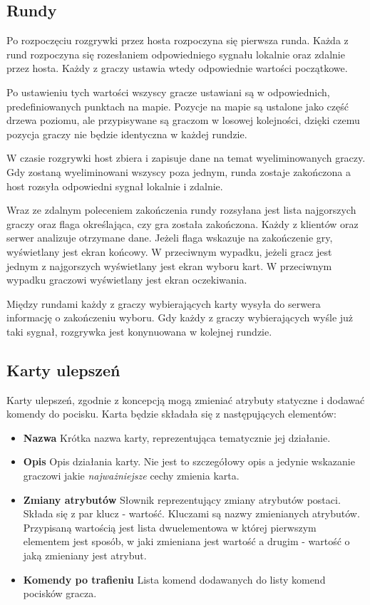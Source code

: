 \subsection{Rundy}
Po rozpoczęciu rozgrywki przez hosta rozpoczyna się pierwsza runda. Każda z rund rozpoczyna się rozesłaniem odpowiedniego sygnału lokalnie oraz zdalnie przez hosta. Każdy z graczy ustawia wtedy odpowiednie wartości początkowe. 

Po ustawieniu tych wartości wszyscy gracze ustawiani są w odpowiednich, predefiniowanych punktach na mapie. Pozycje na mapie są ustalone jako część drzewa poziomu, ale przypisywane są graczom w losowej kolejności, dzięki czemu pozycja graczy nie będzie identyczna w każdej rundzie.

W czasie rozgrywki host zbiera i zapisuje dane na temat wyeliminowanych graczy. Gdy zostaną wyeliminowani wszyscy poza jednym, runda zostaje zakończona a host rozsyła odpowiedni sygnał lokalnie i zdalnie. 

Wraz ze zdalnym poleceniem zakończenia rundy rozsyłana jest lista najgorszych graczy oraz flaga określająca, czy gra została zakończona. Każdy z klientów oraz serwer analizuje otrzymane dane. Jeżeli flaga wskazuje na zakończenie gry, wyświetlany jest ekran końcowy. W przeciwnym wypadku, jeżeli gracz jest jednym z najgorszych wyświetlany jest ekran wyboru kart. W przeciwnym wypadku graczowi wyświetlany jest ekran oczekiwania.

Między rundami każdy z graczy wybierających karty wysyła do serwera informację o zakończeniu wyboru. Gdy każdy z graczy wybierających wyśle już taki sygnał, rozgrywka jest konynuowana w kolejnej rundzie. 

\subsection{Karty ulepszeń}
Karty ulepszeń, zgodnie z koncepcją mogą zmieniać atrybuty statyczne i dodawać komendy do pocisku. Karta będzie składała się z następujących elementów:

\begin{itemize}
    \item \textbf{Nazwa} Krótka nazwa karty, reprezentująca tematycznie jej działanie.
    \item \textbf{Opis} Opis działania karty. Nie jest to szczegółowy opis a jedynie wskazanie graczowi jakie \emph{najważniejsze} cechy zmienia karta.
    \item \textbf{Zmiany atrybutów} Słownik reprezentujący zmiany atrybutów postaci. Składa się z par klucz - wartość. Kluczami są nazwy zmienianych atrybutów. Przypisaną wartością jest lista dwuelementowa w której pierwszym elementem jest sposób, w jaki zmieniana jest wartość a drugim - wartość o jaką zmieniany jest atrybut. 
    \item \textbf{Komendy po trafieniu} Lista komend dodawanych do listy komend pocisków gracza.
\end{itemize}

